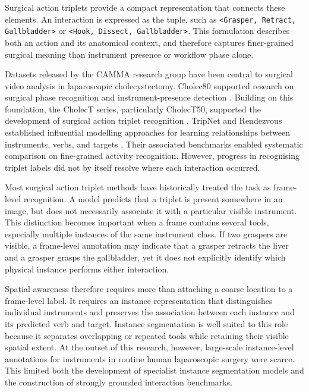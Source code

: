 Surgical action triplets provide a compact representation that connects these elements. An interaction is expressed as the \ivttriplet tuple, such as \texttt{<Grasper, Retract, Gallbladder>} or \texttt{<Hook, Dissect, Gallbladder>}. This formulation describes both an action and its anatomical context, and therefore captures finer-grained surgical meaning than instrument presence or workflow phase alone.

Datasets released by the CAMMA research group have been central to surgical video analysis in laparoscopic cholecystectomy. Cholec80 supported research on surgical phase recognition and instrument-presence detection \cite{EndoNet}. Building on this foundation, the CholecT series, particularly CholecT50, supported the development of surgical action triplet recognition \cite{NWOYE2022102433_rendevous}. TripNet and Rendezvous established influential modelling approaches for learning relationships between instruments, verbs, and targets \cite{1nywoye_rec_action_triplets,NWOYE2022102433_rendevous}. Their associated benchmarks enabled systematic comparison on fine-grained activity recognition. However, progress in recognising triplet labels did not by itself resolve where each interaction occurred.

Most surgical action triplet methods have historically treated the task as frame-level recognition. A model predicts that a triplet is present somewhere in an image, but does not necessarily associate it with a particular visible instrument. This distinction becomes important when a frame contains several tools, especially multiple instances of the same instrument class. If two graspers are visible, a frame-level annotation may indicate that a grasper retracts the liver and a grasper grasps the gallbladder, yet it does not explicitly identify which physical instance performs either interaction.

Spatial awareness therefore requires more than attaching a coarse location to a frame-level label. It requires an instance representation that distinguishes individual instruments and preserves the association between each instance and its predicted verb and target. Instance segmentation is well suited to this role because it separates overlapping or repeated tools while retaining their visible spatial extent. At the outset of this research, however, large-scale instance-level annotations for instruments in routine human laparoscopic surgery were scarce. This limited both the development of specialist instance segmentation models and the construction of strongly grounded interaction benchmarks.

